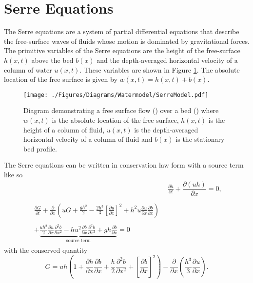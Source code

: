 \documentclass[AMA,STIX1COL]{WileyNJD-v2}
\DeclareRobustCommand{\squareF}[1]{\tikz{\filldraw[#1,fill opacity= 0.3] (0,0) rectangle (0.2cm,0.2cm);}}
\begin{document}
\section{Serre Equations}
The Serre equations \cite{Seabra-Santos-etal-1987-117} are a system of partial differential equations that describe the free-surface waves of fluids whose motion is dominated by gravitational forces. The primitive variables of the Serre equations are the height of the free-surface $h(x,t)$ above the bed $b(x)$ and the depth-averaged horizontal velocity of a column of water $u(x,t)$. These variables are shown in Figure \ref{fig:SerreModel}. The absolute location of the free surface is given by $w(x,t) = h(x,t) + b(x)$.
\begin{figure}
	\centering
	\texttt{[image: ./Figures/Diagrams/Watermodel/SerreModel.pdf]}
	\caption{Diagram demonstrating a free surface flow (\squareF{blue}) over a bed (\squareF{brown!80!black}) where $w(x,t)$ is the absolute location of the free surface, $h(x,t)$ is the height of a column of fluid, $u(x,t)$ is the depth-averaged horizontal velocity of a column of fluid and $b(x)$ is the stationary bed profile.}
	\label{fig:SerreModel}
\end{figure}

The Serre equations can be written in conservation law form with a source term \cite{Zoppou-etal-2017} like so
\begin{subequations}
	\label{eqn:FullSerreCon}
	\begin{align}
	& \frac{\partial h}{\partial t} + \dfrac{\partial (uh)}{\partial x} = 0 ,\label{eqn:FullSerreConMass}  \\ \nonumber \\
	\begin{split}
	\label{eqn:Serreconsconmom}
	\frac{\partial G}{\partial t}  + \frac{\partial}{\partial x} \left( {u} G + \frac{gh^2}{2} - \frac{2h^3}{3} \left[\frac{\partial {u}}{\partial x}\right]^2 + h^2 {u}\frac{\partial {u}}{\partial x}\frac{\partial b}{\partial x} \right) \\ \\ +  \underbrace{\frac{uh^2}{2} \frac{\partial {u}}{\partial x} \frac{\partial^2 b}{\partial x^2}  - h {u}^2\frac{\partial b}{\partial x}\frac{\partial^2 b}{\partial x^2} + gh\frac{\partial b}{\partial x} } _{\text{source term}} = 0
	\end{split}
	\end{align}
\end{subequations}
with the conserved quantity
\begin{equation}
\label{defn:SerreEqnConservedQuantity1}
G =  {u}h \left(1 + \frac{\partial h}{\partial x}\frac{\partial b}{\partial x} + \frac{h}{2}\frac{\partial^2 b}{\partial x^2} + \left[\frac{\partial b}{\partial x}\right]^2 \right) - \frac{\partial}{\partial x}\left(\frac{h^3}{3}  \frac{\partial {u}}{\partial x}\right).
\end{equation}
\end{document}
